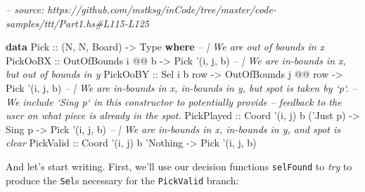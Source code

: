 \documentclass[]{article}
\newenvironment{Shaded}{}{}
\newcommand{\CommentTok}[1]{\textcolor[rgb]{0.38,0.63,0.69}{\textit{#1}}}
\newcommand{\DataTypeTok}[1]{\textcolor[rgb]{0.56,0.13,0.00}{#1}}
\newcommand{\FunctionTok}[1]{\textcolor[rgb]{0.02,0.16,0.49}{#1}}
\newcommand{\KeywordTok}[1]{\textcolor[rgb]{0.00,0.44,0.13}{\textbf{#1}}}
\newcommand{\NormalTok}[1]{#1}
\newcommand{\OtherTok}[1]{\textcolor[rgb]{0.00,0.44,0.13}{#1}}
\begin{document}
\begin{Shaded}
\begin{Highlighting}[]
\CommentTok{-- source: https://github.com/mstksg/inCode/tree/master/code-samples/ttt/Part1.hs#L115-L125}

\KeywordTok{data} \DataTypeTok{Pick}\OtherTok{ ::}\NormalTok{ (}\DataTypeTok{N}\NormalTok{, }\DataTypeTok{N}\NormalTok{, }\DataTypeTok{Board}\NormalTok{) }\OtherTok{->} \DataTypeTok{Type} \KeywordTok{where}
    \CommentTok{-- | We are out of bounds in x}
    \DataTypeTok{PickOoBX}\OtherTok{   ::} \DataTypeTok{OutOfBounds}\NormalTok{ i }\FunctionTok{@@}\NormalTok{ b                         }\OtherTok{->} \DataTypeTok{Pick}\NormalTok{ '(i, j, b)}
    \CommentTok{-- | We are in-bounds in x, but out of bounds in y}
    \DataTypeTok{PickOoBY}\OtherTok{   ::} \DataTypeTok{Sel}\NormalTok{ i b row        }\OtherTok{->} \DataTypeTok{OutOfBounds}\NormalTok{ j }\FunctionTok{@@}\NormalTok{ row }\OtherTok{->} \DataTypeTok{Pick}\NormalTok{ '(i, j, b)}
    \CommentTok{-- | We are in-bounds in x, in-bounds in y, but spot is taken by `p`.}
    \CommentTok{-- We include `Sing p` in this constructor to potentially provide}
    \CommentTok{-- feedback to the user on what piece is already in the spot.}
    \DataTypeTok{PickPlayed}\OtherTok{ ::} \DataTypeTok{Coord}\NormalTok{ '(i, j) b ('}\DataTypeTok{Just}\NormalTok{ p) }\OtherTok{->} \DataTypeTok{Sing}\NormalTok{ p        }\OtherTok{->} \DataTypeTok{Pick}\NormalTok{ '(i, j, b)}
    \CommentTok{-- | We are in-bounds in x, in-bounds in y, and spot is clear}
    \DataTypeTok{PickValid}\OtherTok{  ::} \DataTypeTok{Coord}\NormalTok{ '(i, j) b '}\DataTypeTok{Nothing}                   \OtherTok{->} \DataTypeTok{Pick}\NormalTok{ '(i, j, b)}
\end{Highlighting}
\end{Shaded}

And let's start writing. First, we'll use our decision functions
\texttt{selFound} to \emph{try} to produce the \texttt{Sel}s necessary for the
\texttt{PickValid} branch:

\begin{Shaded}
\end{Shaded}
\end{document}
